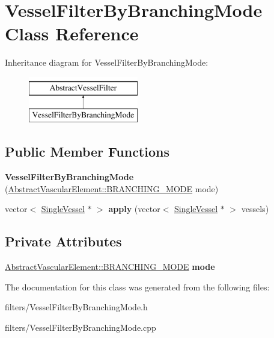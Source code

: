\hypertarget{class_vessel_filter_by_branching_mode}{}\section{Vessel\+Filter\+By\+Branching\+Mode Class Reference}
\label{class_vessel_filter_by_branching_mode}
Inheritance diagram for Vessel\+Filter\+By\+Branching\+Mode\+:\begin{figure}[H]
\begin{center}
\leavevmode
\includegraphics[height=2.000000cm]{d2/d26/class_vessel_filter_by_branching_mode}
\end{center}
\end{figure}
\subsection*{Public Member Functions}
\begin{DoxyCompactItemize}
\item 
{\bfseries Vessel\+Filter\+By\+Branching\+Mode} (\hyperlink{class_abstract_vascular_element_a2f7b3a097b944cd0b056fee00b93c860}{Abstract\+Vascular\+Element\+::\+B\+R\+A\+N\+C\+H\+I\+N\+G\+\_\+\+M\+O\+DE} mode)\hypertarget{class_vessel_filter_by_branching_mode_a161457b80ba91e39dce3ff3a426efedf}{}\label{class_vessel_filter_by_branching_mode_a161457b80ba91e39dce3ff3a426efedf}

\item 
vector$<$ \hyperlink{class_single_vessel}{Single\+Vessel} $\ast$ $>$ {\bfseries apply} (vector$<$ \hyperlink{class_single_vessel}{Single\+Vessel} $\ast$ $>$ vessels)\hypertarget{class_vessel_filter_by_branching_mode_a354fa634e3fdf886cc1be5e01910c926}{}\label{class_vessel_filter_by_branching_mode_a354fa634e3fdf886cc1be5e01910c926}

\end{DoxyCompactItemize}
\subsection*{Private Attributes}
\begin{DoxyCompactItemize}
\item 
\hyperlink{class_abstract_vascular_element_a2f7b3a097b944cd0b056fee00b93c860}{Abstract\+Vascular\+Element\+::\+B\+R\+A\+N\+C\+H\+I\+N\+G\+\_\+\+M\+O\+DE} {\bfseries mode}\hypertarget{class_vessel_filter_by_branching_mode_ae84a29f7425b260ce52fa1c6ab98654a}{}\label{class_vessel_filter_by_branching_mode_ae84a29f7425b260ce52fa1c6ab98654a}

\end{DoxyCompactItemize}


The documentation for this class was generated from the following files\+:\begin{DoxyCompactItemize}
\item 
filters/Vessel\+Filter\+By\+Branching\+Mode.\+h\item 
filters/Vessel\+Filter\+By\+Branching\+Mode.\+cpp\end{DoxyCompactItemize}
